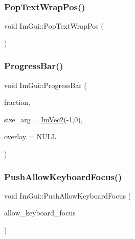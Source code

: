 \hypertarget{namespace_im_gui_a08000421b9cc13757430efe54178ae0f}{}\label{namespace_im_gui_a08000421b9cc13757430efe54178ae0f} 
\subsubsection{\texorpdfstring{Pop\+Text\+Wrap\+Pos()}{PopTextWrapPos()}}
{\footnotesize\ttfamily void Im\+Gui\+::\+Pop\+Text\+Wrap\+Pos (\begin{DoxyParamCaption}{ }\end{DoxyParamCaption})}

\hypertarget{namespace_im_gui_a83349d38c7c73f92ae977bc5b530a9e9}{}\label{namespace_im_gui_a83349d38c7c73f92ae977bc5b530a9e9} 
\subsubsection{\texorpdfstring{Progress\+Bar()}{ProgressBar()}}
{\footnotesize\ttfamily void Im\+Gui\+::\+Progress\+Bar (\begin{DoxyParamCaption}\item[{float}]{fraction,  }\item[{const \hyperlink{struct_im_vec2}{Im\+Vec2} \&}]{size\+\_\+arg = {\ttfamily \hyperlink{struct_im_vec2}{Im\+Vec2}(-\/1,0)},  }\item[{const char $\ast$}]{overlay = {\ttfamily NULL} }\end{DoxyParamCaption})}

\hypertarget{namespace_im_gui_adf7c3cfdcbb06617bb70ff1526d064f4}{}\label{namespace_im_gui_adf7c3cfdcbb06617bb70ff1526d064f4} 
\subsubsection{\texorpdfstring{Push\+Allow\+Keyboard\+Focus()}{PushAllowKeyboardFocus()}}
{\footnotesize\ttfamily void Im\+Gui\+::\+Push\+Allow\+Keyboard\+Focus (\begin{DoxyParamCaption}\item[{bool}]{allow\+\_\+keyboard\+\_\+focus }\end{DoxyParamCaption})}

